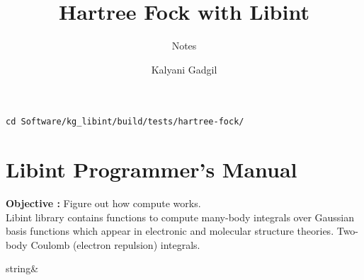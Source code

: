 \documentclass[11pt, oneside]{article}   	%
\title{Hartree Fock with Libint}
\subtitle{Notes}
\author{Kalyani Gadgil}
\begin{document}
\maketitle
\begin{lstlisting}
cd Software/kg_libint/build/tests/hartree-fock/
\end{lstlisting}
\section{Libint Programmer's Manual}
\textbf{Objective :} Figure out how compute works.\\
Libint library contains functions to compute many-body integrals over Gaussian basis functions which appear in electronic and molecular structure theories. Two-body Coulomb (electron repulsion) integrals.
\begin{todolist}
	\item string&
\end{todolist}
\end{document}
